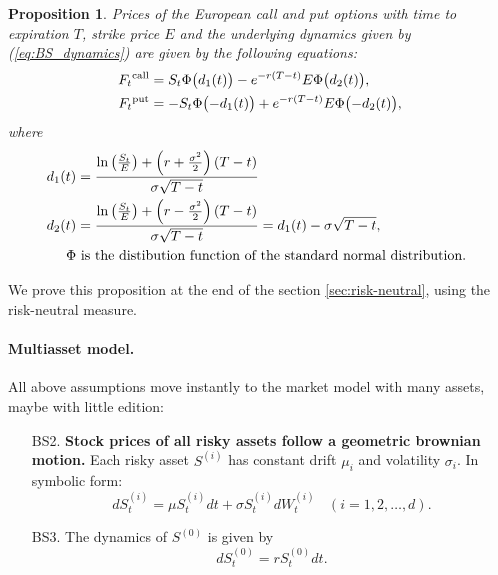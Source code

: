 \documentclass[a4paper,11pt, twoside]{book}
\newtheorem{prop}[thm]{Proposition}
\theoremstyle{definition}
\theoremstyle{remark}
\begin{document}
\begin{prop}
\label{prop:BSFormula}
Prices of the European call and put options with time to expiration $T$, strike price $E$ and the underlying dynamics given by (\ref{eq:BS_dynamics}) are given by the following equations:
\begin{equation*}
  \begin{split}
    F_t\textsuperscript{call} &= S_t \Phi\bigl( d_1(t) \bigr) - e^{-r(T-t)} E \Phi\bigl(d_2(t) \bigr),\\
    F_t\textsuperscript{put} &= -S_t \Phi\bigl(-d_1(t) \bigr) + e^{-r(T-t)} E \Phi\bigl(-d_2(t) \bigr), 
  \end{split}
\end{equation*}
where
\begin{align*}
d_1(t) &= \frac{\ln\left(\frac{S_t}{E}\right)+\left(r+\frac{\sigma^{2}}{2}\right)(T-t)}{\sigma\sqrt{T-t}}\\
d_2(t) &= \frac{\ln\left(\frac{S_t}{E}\right)+\left(r-\frac{\sigma^{2}}{2}\right)(T-t)}{\sigma\sqrt{T-t}} = d_{1}(t)-\sigma\sqrt{T-t},\\
\Phi & \hbox{ is the distibution function of the standard normal distribution. } 
\end{align*}
\end{prop}
We prove this proposition at the end of the section \ref{sec:risk-neutral}, using the risk-neutral measure.

\paragraph{Multiasset model.}
All above assumptions move instantly to the market model with many assets, maybe with little edition:
\begin{enumerate}
 \item[BS2.] \textbf{Stock prices of all risky assets follow a geometric brownian motion.} Each risky asset $S^{(i)}$ has constant drift $\mu_i$ and volatility $\sigma_i$. In symbolic form:
\begin{equation}
 \label{eq:BS_multi_dynamics}
 dS^{(i)}_t = \mu S^{(i)}_t dt + \sigma S^{(i)}_t dW^{(i)}_t\ \ \ \ (i=1,2,\ldots,d). 
\end{equation}
  \item[BS3.]  The dynamics of $S^{(0)}$ is given by 
\[ dS^{(0)}_t = rS^{(0)}_t dt. \]
\end{enumerate}
  
\end{document}
